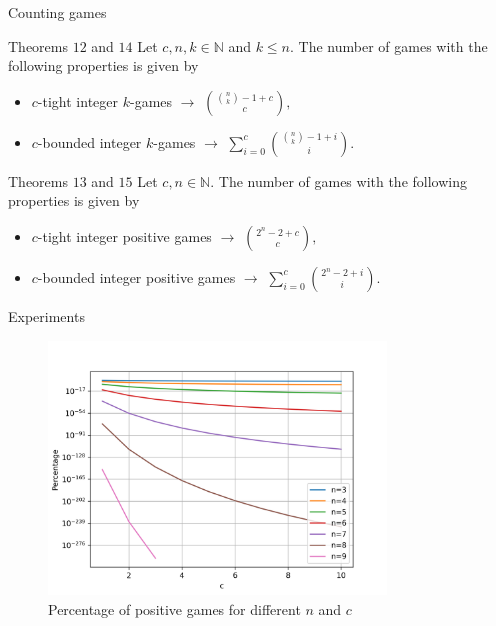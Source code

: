 \documentclass{beamer}
\begin{document}
\begin{frame}{Counting games}
    \pause

    \begin{block}{Theorems $12$ and $14$}
        Let $c, n, k \in \mathbb{N}$ and $k \leq n$.
        The number of games with the following properties is given by

        \begin{itemize}
            \item $c$-tight integer $k$-games $\rightarrow$ $\binom{\binom{n}{k}-1+c}{c},$
            \item $c$-bounded integer $k$-games $\rightarrow$ $\sum_{i=0}^{c}\binom{\binom{n}{k}-1+i}{i}.$
        \end{itemize}
    \end{block}

    \pause

    \begin{block}{Theorems $13$ and $15$}
        Let $c, n \in \mathbb{N}$.
        The number of games with the following properties is given by

        \begin{itemize}
            \item $c$-tight integer positive games $\rightarrow$ $\binom{2^{n}-2+c}{c},$
            \item $c$-bounded integer positive games $\rightarrow$ $\sum_{i=0}^{c}\binom{2^{n}-2+i}{i}.$
        \end{itemize}
    \end{block}
\end{frame}



\begin{frame}{Experiments}
    \pause

    \begin{figure}
        \includegraphics[width=0.8\textwidth]{../img/figure_log_percentage_positive_games.png}
        \centering
        \caption{Percentage of positive games for different $n$ and $c$}
    \end{figure}
\end{frame}
\end{document}
